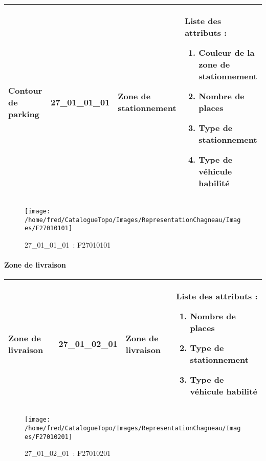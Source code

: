 \documentclass[12pt,titlepage,oneside]{book}
\begin{document}
\renewcommand{\arraystretch}{1.2}
\begin{supertabular}{|p{10cm}|c|p{13cm}|p{12cm}|}
 Contour de parking & 27\_01\_01\_01 & Zone de stationnement & Liste des attributs :
\begin{enumerate}
  \item Couleur de la zone de stationnement  \item Nombre de places  \item Type de stationnement  \item Type de véhicule habilité\end{enumerate}
\\
\hline
\end{supertabular}
\begin{figure}[h!]
  \hfill         %
  \begin{minipage}[t]{3cm}
    \begin{center}
      \texttt{[image: /home/fred/CatalogueTopo/Images/RepresentationChagneau/Images/F27010101]}
      \caption[~27\_01\_01\_01]{\small{27\_01\_01\_01~:} \tiny{F27010101}}\label{F27010101}
    \end{center}
  \end{minipage}
\end{figure}


\paragraph{Zone de livraison}
\noindent
\vspace{\baselineskip}

\renewcommand{\arraystretch}{1.2}
\begin{supertabular}{|p{10cm}|c|p{13cm}|p{12cm}|}
 Zone de livraison & 27\_01\_02\_01 & Zone de livraison & Liste des attributs :
\begin{enumerate}
  \item Nombre de places  \item Type de stationnement  \item Type de véhicule habilité\end{enumerate}
\\
\hline
\end{supertabular}
\begin{figure}[h!]
  \hfill         %
  \begin{minipage}[t]{3cm}
    \begin{center}
      \texttt{[image: /home/fred/CatalogueTopo/Images/RepresentationChagneau/Images/F27010201]}
      \caption[~27\_01\_02\_01]{\small{27\_01\_02\_01~:} \tiny{F27010201}}\label{F27010201}
    \end{center}
  \end{minipage}
\end{figure}
\end{document}

